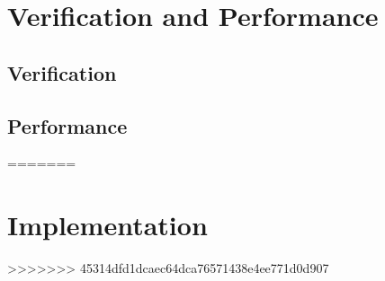 \documentclass[x11names,twoside,english]{uiofysmaster}
\begin{document}
%     
%     
%     
%     
%
\chapter{Verification and Performance}
	\section{Verification}
    
    
    
    
    

	\section{Performance}
	
    
    
    
=======
%
%     
%     
%     
%     
%
\chapter{Implementation}
    
    
    
    

%     
%     
%     
%     
%     
%     
%     
%     
%     
%     
>>>>>>> 45314dfd1dcaec64dca76571438e4ee771d0d907
\end{document}
